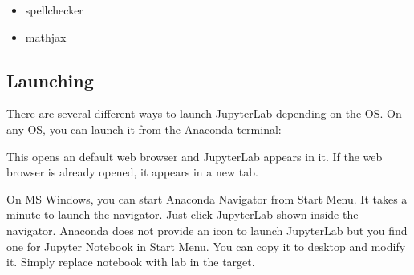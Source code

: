 \documentclass[letterpaper,10pt,english]{jupyterBook}
\begin{document}
\begin{sphinxVerbatim}[commandchars=\\\{\}]
  
    
\end{sphinxVerbatim}
\begin{itemize}
\item {}
\sphinxAtStartPar
spellchecker

\end{itemize}

\begin{sphinxVerbatim}[commandchars=\\\{\}]
  
\end{sphinxVerbatim}
\begin{itemize}
\item {}
\sphinxAtStartPar
mathjax

\end{itemize}

\begin{sphinxVerbatim}[commandchars=\\\{\}]
  
  
\end{sphinxVerbatim}


\subsection{Launching}
\label{\detokenize{preparation/jupyter:launching}}
\sphinxAtStartPar
There are several different ways to launch JupyterLab depending on the OS.  On any OS, you can launch it from the Anaconda terminal:

\begin{sphinxVerbatim}[commandchars=\\\{\}]
\end{sphinxVerbatim}

\sphinxAtStartPar
This opens an default web browser and JupyterLab appears in it.  If the web browser is already opened, it appears in a new tab.

\sphinxAtStartPar
On MS Windows, you can start Anaconda Navigator from Start Menu.  It takes a minute to launch the navigator.  Just click JupyterLab shown inside the navigator.  Anaconda does not provide an icon to launch JupyterLab but you find one for Jupyter Notebook in Start Menu.  You can copy it to desktop and modify it.  Simply replace notebook with lab in the target.
\end{document}
